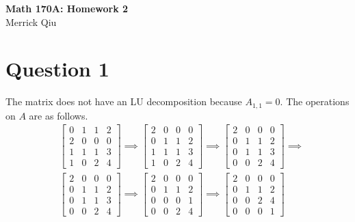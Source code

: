 \documentclass{article}
\begin{document}
\begin{center}
	\huge{\bf Math 170A: Homework 2} \\
	Merrick Qiu
\end{center}

\section*{Question 1}
The matrix does not have an LU decomposition because $A_{1,1} = 0$.
The operations on $A$ are as follows.
\begin{align*}
    &\begin{bmatrix}
        0 & 1 & 1 & 2 \\
        2 & 0 & 0 & 0 \\
        1 & 1 & 1 & 3 \\
        1 & 0 & 2 & 4
    \end{bmatrix} \implies 
    \begin{bmatrix}
        2 & 0 & 0 & 0 \\
        0 & 1 & 1 & 2 \\
        1 & 1 & 1 & 3 \\
        1 & 0 & 2 & 4
    \end{bmatrix} \implies
    \begin{bmatrix}
        2 & 0 & 0 & 0 \\
        0 & 1 & 1 & 2 \\
        0 & 1 & 1 & 3 \\
        0 & 0 & 2 & 4
    \end{bmatrix} \implies \\
    &\begin{bmatrix}
        2 & 0 & 0 & 0 \\
        0 & 1 & 1 & 2 \\
        0 & 1 & 1 & 3 \\
        0 & 0 & 2 & 4
    \end{bmatrix} \implies
    \begin{bmatrix}
        2 & 0 & 0 & 0 \\
        0 & 1 & 1 & 2 \\
        0 & 0 & 0 & 1 \\
        0 & 0 & 2 & 4
    \end{bmatrix} \implies 
    \begin{bmatrix}
        2 & 0 & 0 & 0 \\
        0 & 1 & 1 & 2 \\
        0 & 0 & 2 & 4 \\
        0 & 0 & 0 & 1
    \end{bmatrix}
\end{align*}
\end{document}
